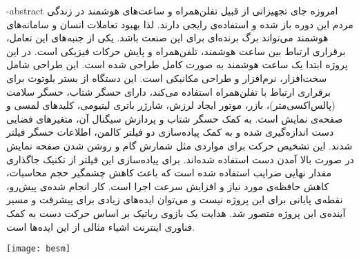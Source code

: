 \department{}

\fa-abstract{
امروزه جای تجهیزاتی از قبیل تفلن‌همراه و ساعت‌های هوشمند در زندگی مردم این دوره باز شده و استفاده‌ی رایجی دارند. لذا بهبود تعاملات انسان و سامانه‌های هوشمند می‌تواند برگ برنده‌ای برای این صنعت باشد. یکی از جنبه‌های این تعامل، برقراری ارتباط بین ساعت هوشمند، تلفن‌همراه و پایش حرکات فیزیکی است. در این پروژه ابتدا یک ساعت هوشمند به صورت کامل طراحی شده است. این طراحی شامل سخت‌افزار، نرم‌افزار و طراحی مکانیکی است. این دستگاه از بستر بلوتوث برای برقراری ارتباط با تفلن‌همراه استفاده می‌کند، دارای حسگر شتاب،‌ حسگر سلامت (پالس‌اکسی‌متر)، بازر، موتور ایجاد لرزش، شارژر باتری لیتیومی، کلیدهای لمسی و صفحه‌ی نمایش است. به کمک حسگر شتاب و پردازش سیگنال آن، متغیرهای فضایی دست اندازه‌گیری شده و به کمک پیاده‌سازی دو فیلتر کالمن، اطلاعات حسگر فیلتر شدند. این تشخیص حرکت برای مواردی مثل شمارش گام و روشن شدن صفحه نمایش در صورت بالا آمدن دست استفاده شده‌اند. برای پیاده‌سازی این فیلتر از تکنیک جاگذاری مقدار نهایی ضرایب استفاده شده است که باعث کاهش چشمگیر حجم محاسبات، کاهش حافظه‌ی مورد نیاز و افزایش سرعت اجرا است. کار انجام شده‌ی پیش‌رو، نقطه‌ی پایانی برای این پروژه نیست و می‌توان ایده‌های زیادی برای پیشرفت و مسیر آینده‌ی این پروژه متصور شد. هدایت یک بازوی رباتیک بر اساس حرکت دست به کمک فناوری اینترنت اشیاء مثالی از این ایده‌ها است.
}





\AUTtitle
\vspace*{7cm}
\thispagestyle{empty}
\begin{center}
\texttt{[image: besm]}
\end{center}